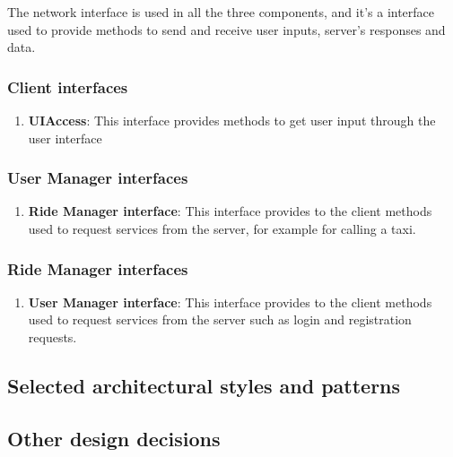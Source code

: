 The network interface is used in all the three components, and it's a interface used to provide methods to send and receive user inputs, server's responses and data.
\subsubsection{Client interfaces}
\begin{enumerate}
	\item \textbf{UIAccess}: This interface provides methods to get user input through the user interface
\end{enumerate}
\subsubsection{User Manager interfaces}
\begin{enumerate}
	\item \textbf{Ride Manager interface}: This interface provides to the client methods used to request services from the server, for example for calling a taxi.
\end{enumerate}
\subsubsection{Ride Manager interfaces}
	\begin{enumerate}
		\item \textbf{User Manager interface}: This interface provides to the client methods used to request services from the server such as login and registration requests.
	\end{enumerate}
	
\subsection{Selected architectural styles and patterns}

\subsection{Other design decisions}